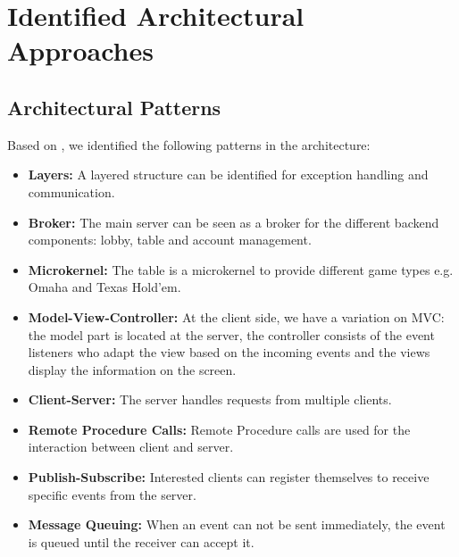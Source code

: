 \documentclass[a4paper,11pt]{report}
\begin{document}
\section{Identified Architectural Approaches}
\subsection{Architectural Patterns}
Based on \cite{Avgeriou2005}, we identified the following patterns in the architecture:
\begin{itemize}
\item \textbf{Layers:} A layered structure can be identified for exception handling and communication.
\item \textbf{Broker:} The main server can be seen as a broker for the different backend components: lobby, table and account management.
\item \textbf{Microkernel:} The table is a microkernel to provide different game types e.g. Omaha and Texas Hold'em.
\item \textbf{Model-View-Controller:} At the client side, we have a variation on MVC: the model part is located
at the server, the controller consists of the event listeners who adapt the view based on the incoming events and
the views display the information on the screen.
\item \textbf{Client-Server:} The server handles requests from multiple clients.
\item \textbf{Remote Procedure Calls:} Remote Procedure calls are used for the interaction between client and server.
\item \textbf{Publish-Subscribe:} Interested clients can register themselves to receive specific events from the server.
\item \textbf{Message Queuing:} When an event can not be sent immediately, the event is queued until the receiver can accept it.
\end{itemize}
\end{document}
